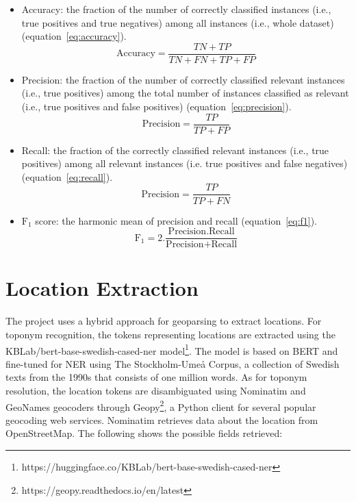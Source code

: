 \begin{itemize}
  \item Accuracy: the fraction of the number of correctly classified instances (i.e., true positives
    and true negatives) among all instances (i.e., whole dataset) (equation~\ref{eq:accuracy}).
 \begin{equation}
   \text{Accuracy}=\frac{TN+TP}{TN+FN+TP+FP} 
   \label{eq:accuracy}
\end{equation}
\item Precision: the fraction of the number of correctly classified relevant instances (i.e., true
  positives) among the total number of instances classified as relevant (i.e., true positives and
  false positives) (equation~\ref{eq:precision}).
 \begin{equation}
   \text{Precision}=\frac{TP}{TP+FP} 
   \label{eq:precision}
\end{equation}
\item Recall: the fraction of the correctly classified relevant instances (i.e., true positives)
  among all relevant instances (i.e. true positives and false negatives) (equation~\ref{eq:recall}).
 \begin{equation}
   \text{Precision}=\frac{TP}{TP+FN} 
   \label{eq:recall}
\end{equation}
\item $\text{F}_1$ score: the harmonic mean of precision and recall (equation~\ref{eq:f1}).
 \begin{equation}
   \text{F}_1 =2.\frac{\text{Precision}.\text{Recall}}{\text{Precision}+\text{Recall}} 
   \label{eq:f1}
\end{equation}
\end{itemize}
  

\section{Location Extraction}

The project uses a hybrid approach for geoparsing to extract locations. For toponym recognition, the
tokens representing locations are extracted using the KBLab/bert-base-swedish-cased-ner
model\footnote{https://huggingface.co/KBLab/bert-base-swedish-cased-ner}. The model is based on BERT
and fine-tuned for \ac{NER} using The Stockholm-Umeå Corpus, a collection of Swedish texts from the
1990s that consists of one million words. As for toponym resolution, the location tokens are
disambiguated using Nominatim and GeoNames geocoders through
Geopy\footnote{https://geopy.readthedocs.io/en/latest}, a Python client for several
popular geocoding web services. Nominatim retrieves data about the location from OpenStreetMap. The
following shows the possible fields retrieved:

